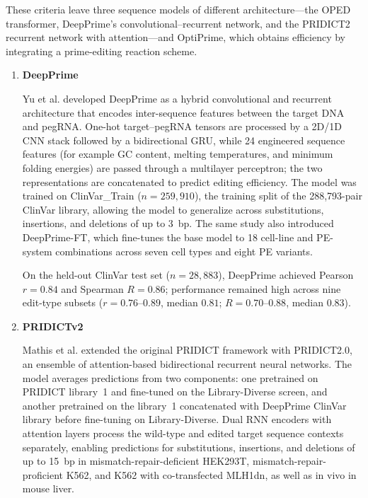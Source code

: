 \documentclass{article}
\begin{document}
These criteria leave three sequence models of different architecture---the OPED transformer\cite{liuDesignPrimeeditingGuide2023}, DeepPrime's convolutional--recurrent network, and the PRIDICT2 recurrent network with attention---and OptiPrime\cite{hsuMechanisticMachineLearning2026}, which obtains efficiency by integrating a prime-editing reaction scheme.

\begin{enumerate}
    \item \textbf{DeepPrime}

    Yu et al.\cite{yuPredictionEfficienciesDiverse2023} developed DeepPrime as a hybrid convolutional and recurrent architecture that encodes inter-sequence features between the target DNA and pegRNA. One-hot target--pegRNA tensors are processed by a 2D/1D CNN stack followed by a bidirectional GRU, while 24 engineered sequence features (for example GC content, melting temperatures, and minimum folding energies) are passed through a multilayer perceptron; the two representations are concatenated to predict editing efficiency. The model was trained on ClinVar\_Train ($n = 259{,}910$), the training split of the 288{,}793-pair ClinVar library, allowing the model to generalize across substitutions, insertions, and deletions of up to 3~bp. The same study also introduced DeepPrime-FT, which fine-tunes the base model to 18 cell-line and PE-system combinations across seven cell types and eight PE variants.
    
    On the held-out ClinVar test set ($n = 28{,}883$), DeepPrime achieved Pearson $r = 0.84$ and Spearman $R = 0.86$; performance remained high across nine edit-type subsets ($r = 0.76$--$0.89$, median $0.81$; $R = 0.70$--$0.88$, median $0.83$). 

    \item \textbf{PRIDICTv2}

    Mathis et al.\cite{mathisMachineLearningPrediction2024} extended the original PRIDICT framework with PRIDICT2.0, an ensemble of attention-based bidirectional recurrent neural networks. The model averages predictions from two components: one pretrained on PRIDICT library~1 and fine-tuned on the Library-Diverse screen, and another pretrained on the library~1 concatenated with DeepPrime ClinVar library before fine-tuning on Library-Diverse. Dual RNN encoders with attention layers process the wild-type and edited target sequence contexts separately, enabling predictions for substitutions, insertions, and deletions of up to 15~bp in mismatch-repair-deficient HEK293T, mismatch-repair-proficient K562, and K562 with co-transfected MLH1dn, as well as in vivo in mouse liver. 
    

\end{enumerate}
\end{document}
